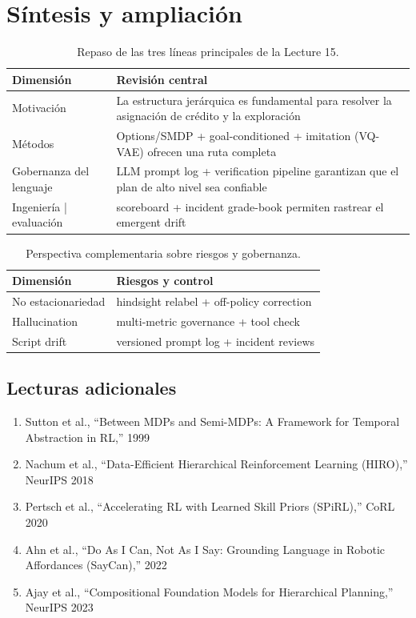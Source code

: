 \section{Síntesis y ampliación}

\begin{table}[H]
\centering
\begin{tabular}{p{3.5cm}p{8cm}}
\toprule
Dimensión & Revisión central \\
\midrule
Motivación & La estructura jerárquica es fundamental para resolver la asignación de crédito y la exploración \\
Métodos & Options/SMDP + goal-conditioned + imitation (VQ-VAE) ofrecen una ruta completa \\
Gobernanza del lenguaje & LLM prompt log + verification pipeline garantizan que el plan de alto nivel sea confiable \\
Ingeniería | evaluación & scoreboard + incident grade-book permiten rastrear el emergent drift \\
\bottomrule
\end{tabular}
\caption{Repaso de las tres líneas principales de la Lecture 15.}
\end{table}

\begin{table}[H]
\centering
\begin{tabular}{p{3.5cm}p{8cm}}
\toprule
Dimensión & Riesgos y control \\
\midrule
No estacionariedad & hindsight relabel + off-policy correction \\
Hallucination & multi-metric governance + tool check \\
Script drift & versioned prompt log + incident reviews \\
\bottomrule
\end{tabular}
\caption{Perspectiva complementaria sobre riesgos y gobernanza.}
\end{table}

\subsection{Lecturas adicionales}
\begin{enumerate}
    \item Sutton et al., ``Between MDPs and Semi-MDPs: A Framework for Temporal Abstraction in RL,'' 1999
    \item Nachum et al., ``Data-Efficient Hierarchical Reinforcement Learning (HIRO),'' NeurIPS 2018
    \item Pertsch et al., ``Accelerating RL with Learned Skill Priors (SPiRL),'' CoRL 2020
    \item Ahn et al., ``Do As I Can, Not As I Say: Grounding Language in Robotic Affordances (SayCan),'' 2022
    \item Ajay et al., ``Compositional Foundation Models for Hierarchical Planning,'' NeurIPS 2023
\end{enumerate}


